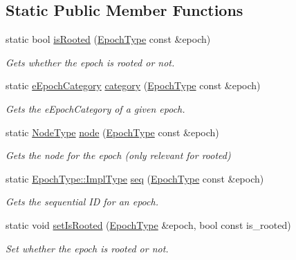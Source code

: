 \subsection*{Static Public Member Functions}
\begin{DoxyCompactItemize}
\item 
static bool \hyperlink{structvt_1_1epoch_1_1_epoch_manip_a00210a34334fb86984cfbd08bae74929}{is\+Rooted} (\hyperlink{structvt_1_1epoch_1_1_epoch_type}{Epoch\+Type} const \&epoch)
\begin{DoxyCompactList}\small\item\em Gets whether the epoch is rooted or not. \end{DoxyCompactList}\item 
static \hyperlink{namespacevt_1_1epoch_a956abe0aceef0d10a988de8acb002c7c}{e\+Epoch\+Category} \hyperlink{structvt_1_1epoch_1_1_epoch_manip_aa61d47033545df147c01036211c4cabe}{category} (\hyperlink{structvt_1_1epoch_1_1_epoch_type}{Epoch\+Type} const \&epoch)
\begin{DoxyCompactList}\small\item\em Gets the {\ttfamily e\+Epoch\+Category} of a given epoch. \end{DoxyCompactList}\item 
static \hyperlink{namespacevt_a866da9d0efc19c0a1ce79e9e492f47e2}{Node\+Type} \hyperlink{structvt_1_1epoch_1_1_epoch_manip_a7120f73ef583ab8f061334fc0bc519c3}{node} (\hyperlink{structvt_1_1epoch_1_1_epoch_type}{Epoch\+Type} const \&epoch)
\begin{DoxyCompactList}\small\item\em Gets the node for the epoch (only relevant for rooted) \end{DoxyCompactList}\item 
static \hyperlink{structvt_1_1epoch_1_1_epoch_type_aef70d29ac80a421e67bc15ffbe9b9e70}{Epoch\+Type\+::\+Impl\+Type} \hyperlink{structvt_1_1epoch_1_1_epoch_manip_a0205c8fbd8bafaf35c0102a061c0d09f}{seq} (\hyperlink{structvt_1_1epoch_1_1_epoch_type}{Epoch\+Type} const \&epoch)
\begin{DoxyCompactList}\small\item\em Gets the sequential ID for an epoch. \end{DoxyCompactList}\item 
static void \hyperlink{structvt_1_1epoch_1_1_epoch_manip_aae48ba1aafb105551df363ffcb578881}{set\+Is\+Rooted} (\hyperlink{structvt_1_1epoch_1_1_epoch_type}{Epoch\+Type} \&epoch, bool const is\+\_\+rooted)
\begin{DoxyCompactList}\small\item\em Set whether the {\ttfamily epoch} is rooted or not. \end{DoxyCompactList}\item 

\end{DoxyCompactItemize}
